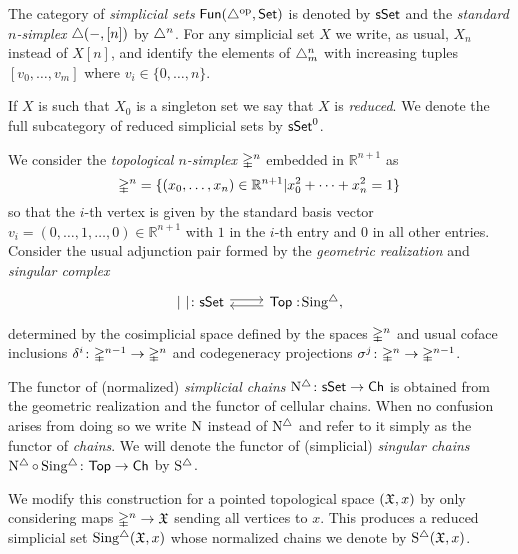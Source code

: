 The category of \textit{simplicial sets} $\mathsf{Fun}(\triangle^{\mathrm{op}}, \mathsf{Set})$ is denoted by $\mathsf{sSet}$ and the \textit{standard $n$-simplex} $\triangle(-, [n])$ by $\triangle^n$.
For any simplicial set $X$ we write, as usual, $X_n$ instead of $X[n]$, and identify the elements of $\triangle^n_m$ with increasing tuples $[v_0, \dots, v_m]$ where $v_i \in \{0, \dots, n\}$.

If $X$ is such that $X_0$ is a singleton set we say that $X$ is \textit{reduced}.
We denote the full subcategory of reduced simplicial sets by $\mathsf{sSet}^0$.

We consider the \textit{topological $n$-simplex} $\mathbb{\Delta}^n$ embedded in $\mathbb{R}^{n+1}$ as
\[ \mathbb{\Delta}^n = \{ (x_0, \dots, x_n) \in \mathbb{R}^{n+1} | x_0^2 + \dots + x_n^2=1\} \]
so that the $i$-th vertex is given by the standard basis vector $v_i=(0,\ldots,1, \ldots,0) \in \mathbb{R}^{n+1}$ with $1$ in the $i$-th entry and $0$ in all other entries. Consider the usual adjunction pair formed by the \textit{geometric realization} and \textit{singular complex}
\[
\begin{tikzcd}
	\bars{\ } \colon \sSet \arrow[r, shift left=.5ex] &
	\Top :\! \sSing, \arrow[l, shift left=.5ex]
\end{tikzcd}
\]
determined by the cosimplicial space defined by the spaces $\mathbb{\Delta}^n$ and usual coface inclusions $\delta^i \colon \mathbb{\Delta}^{n-1} \to \mathbb{\Delta}^n$ and codegeneracy projections $\sigma^j \colon \mathbb{\Delta}^n \to \mathbb{\Delta}^{n-1}$.

The functor of (normalized) \textit{simplicial chains} $\operatorname{N^{\triangle}} \colon \mathsf{sSet} \to \mathsf{Ch}$ is obtained from the geometric realization and the functor of cellular chains.
When no confusion arises from doing so we write $\operatorname{N}$ instead of $\operatorname{N^{\triangle}}$ and refer to it simply as the functor of \textit{chains}.
We will denote the functor of (simplicial) \textit{singular chains} $\operatorname{N^{\triangle}} \circ \operatorname{Sing^{\triangle}} \colon \mathsf{Top} \to \mathsf{Ch}$ by $\operatorname{S^{\triangle}}$.

We modify this construction for a pointed topological space $(\mathfrak{X},x)$ by only considering maps $\mathbb{\Delta}^n \to \mathfrak{X}$ sending all vertices to $x$.
This produces a reduced simplicial set $\operatorname{Sing^{\triangle}}(\mathfrak{X},x)$ whose normalized chains we denote by $\operatorname{S^{\triangle}}(\mathfrak{X},x)$.

